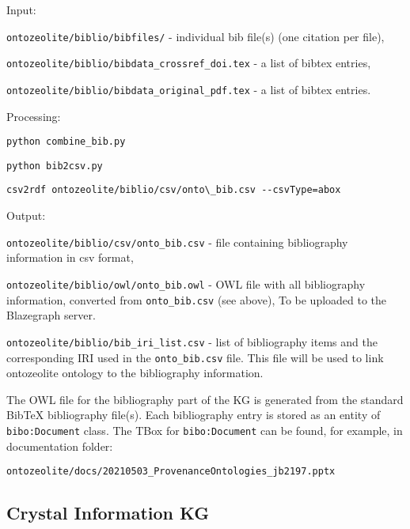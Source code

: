 \documentclass{article}
\begin{document}
Input: 

\hspace{1cm} \texttt{ontozeolite/biblio/bibfiles/} -
individual bib file(s) (one citation per file), 

\hspace{1cm} \texttt{ontozeolite/biblio/bibdata\_crossref\_doi.tex}
- a list of bibtex entries, 

\hspace{1cm} \texttt{ontozeolite/biblio/bibdata\_original\_pdf.tex}
- a list of bibtex entries.

Processing: 

\hspace{1cm} \texttt{python combine\_bib.py} 

\hspace{1cm} \texttt{python bib2csv.py} 

\hspace{1cm} 
\verb|csv2rdf ontozeolite/biblio/csv/onto\_bib.csv --csvType=abox|

Output: 

\hspace{1cm} 
\texttt{ontozeolite/biblio/csv/onto\_bib.csv} 
- file containing bibliography information in csv format,

\hspace{1cm} 
\texttt{ontozeolite/biblio/owl/onto\_bib.owl} 
- OWL file with all bibliography information, converted from \texttt{onto\_bib.csv} (see above),
To be uploaded to the Blazegraph server.

\hspace{1cm} 
\texttt{ontozeolite/biblio/bib\_iri\_list.csv}
- list of bibliography items and the corresponding IRI used in the \texttt{onto\_bib.csv} file.
This file will be used to link ontozeolite ontology to the bibliography information.

The OWL file for the bibliography part of the KG is generated from the standard Bib\TeX{} bibliography file(s). 
Each bibliography entry is stored as an entity of \texttt{bibo:Document} class. 
The TBox for \texttt{bibo:Document} can be found, for example, in documentation folder:

\texttt{ontozeolite/docs/20210503\_ProvenanceOntologies\_jb2197.pptx} 


\subsection{Crystal Information KG}
\label{sec:zeolite_data_crystal}
\end{document}
